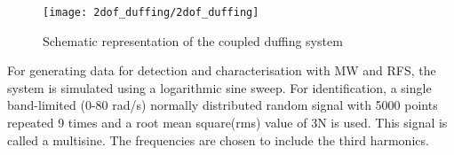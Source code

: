 \begin{figure}[!ht]
  \centering
  \texttt{[image: 2dof\_duffing/2dof\_duffing]}
  \caption{Schematic representation of the coupled duffing system}
  \label{fig:duf_schematic}
\end{figure}

For generating data for detection and characterisation with MW and RFS, the
system is simulated using a logarithmic sine sweep.
For identification, a single band-limited (0-80 rad/s) normally distributed
random signal with 5000 points repeated 9 times and a root mean square(rms)
value of 3N is used. This signal is called a multisine. The frequencies are
chosen to include the third harmonics.


